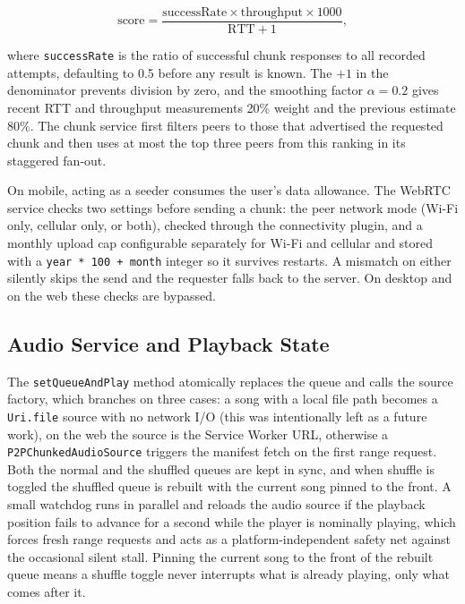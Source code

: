 \begin{equation}
  \text{score} = \frac{\text{successRate} \times \text{throughput} \times 1000}{\text{RTT} + 1},
  \label{eq:peer-score}
\end{equation}

where \texttt{successRate} is the ratio of successful chunk responses to all recorded attempts, defaulting to 0.5 before any result is known. The $+1$ in the denominator prevents division by zero, and the smoothing factor $\alpha = 0.2$ gives recent RTT and throughput measurements 20\% weight and the previous estimate 80\%. The chunk service first filters peers to those that advertised the requested chunk and then uses at most the top three peers from this ranking in its staggered fan-out.

\indent \par On mobile, acting as a seeder consumes the user's data allowance. The WebRTC service checks two settings before sending a chunk: the peer network mode (Wi-Fi only, cellular only, or both), checked through the connectivity plugin, and a monthly upload cap configurable separately for Wi-Fi and cellular and stored with a \texttt{year * 100 + month} integer so it survives restarts. A mismatch on either silently skips the send and the requester falls back to the server. On desktop and on the web these checks are bypassed.


\subsection{Audio Service and Playback State}
\label{sec:audio-service}

\indent \par The \texttt{setQueueAndPlay} method atomically replaces the queue and calls the source factory, which branches on three cases: a song with a local file path becomes a \texttt{Uri.file} source with no network I/O (this was intentionally left as a future work), on the web the source is the Service Worker URL, otherwise a \texttt{P2PChunkedAudioSource} triggers the manifest fetch on the first range request. Both the normal and the shuffled queues are kept in sync, and when shuffle is toggled the shuffled queue is rebuilt with the current song pinned to the front. A small watchdog runs in parallel and reloads the audio source if the playback position fails to advance for a second while the player is nominally playing, which forces fresh range requests and acts as a platform-independent safety net against the occasional silent stall. Pinning the current song to the front of the rebuilt queue means a shuffle toggle never interrupts what is already playing, only what comes after it.

